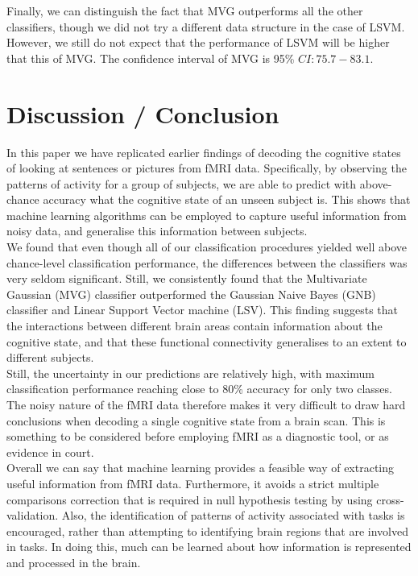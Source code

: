 \documentclass[preprint,journal,11pt]{vgtc}
\begin{document}
Finally, we can distinguish the fact that MVG outperforms all the other classifiers, though we did not try a different data structure in the case of LSVM. However, we still do not expect that the performance of LSVM will be higher that this of MVG. The confidence interval of MVG is 95\% $CI: 75.7-83.1$.

\section{Discussion / Conclusion}
\label{sec:discussion}

In this paper we have replicated earlier findings of decoding the cognitive states of looking at sentences or pictures from fMRI data. Specifically, by observing the patterns of activity for a group of subjects, we are able to predict with above-chance accuracy what the cognitive state of an unseen subject is. This shows that machine learning algorithms can be employed to capture useful information from noisy data, and generalise this information between subjects.\\
\indent We found that even though all of our classification procedures yielded well above chance-level classification performance, the differences between the classifiers was very seldom significant. Still, we consistently found that the Multivariate Gaussian (MVG) classifier outperformed the Gaussian Naive Bayes (GNB) classifier and Linear Support Vector machine (LSV). This finding suggests that the interactions between different brain areas contain information about the cognitive state, and that these functional connectivity generalises to an extent to different subjects.\\
\indent Still, the uncertainty in our predictions are relatively high, with maximum classification performance reaching close to 80\% accuracy for only two classes. The noisy nature of the fMRI data therefore makes it very difficult to draw hard conclusions when decoding a single cognitive state from a brain scan. This is something to be considered before employing fMRI as a diagnostic tool, or as evidence in court.\\
\indent Overall we can say that machine learning provides a feasible way of extracting useful information from fMRI data. Furthermore, it avoids a strict multiple comparisons correction that is required in null hypothesis testing by using cross-validation. Also, the identification of patterns of activity associated with tasks is encouraged, rather than attempting to identifying brain regions that are involved in tasks. In doing this, much can be learned about how information is represented and processed in the brain.




\end{document}
